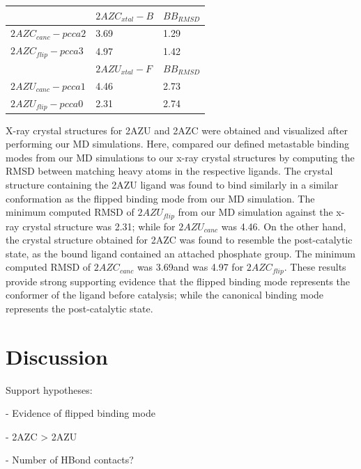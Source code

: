 \documentclass[fleqn,10pt]{wlscirep}
\newcommand{\angstrom}{\text{\normalfont\AA}}
\begin{document}
\begin{table}[!ht]
\begin{tabular}{|l|l|l|}
\hline
                          & \textbf{$2AZC_{xtal}-B$} & \textbf{$BB_{RMSD}$} \\ \hline
\textbf{$2AZC_{canc}-pcca2$} & 3.69                  & 1.29             \\ \hline
\textbf{$2AZC_{flip}-pcca3$} & 4.97                  & 1.42              \\ \hline
\textbf{}                 & \textbf{$2AZU_{xtal}-F$} & \textbf{$BB_{RMSD}$} \\ \hline
\textbf{$2AZU_{canc}-pcca1$} & 4.46                  & 2.73             \\ \hline
\textbf{$2AZU_{flip}-pcca0$} & 2.31                  & 2.74              \\ \hline
\end{tabular}
\end{table}

X-ray crystal structures for 2AZU and 2AZC were obtained and visualized after performing our MD simulations.
Here, compared our defined metastable binding modes from our MD simulations to our x-ray crystal structures by computing the RMSD between matching heavy atoms in the respective ligands.
The crystal structure containing the 2AZU ligand was found to bind similarly in a similar conformation as the flipped binding mode from our MD simulation.
The minimum computed RMSD of $2AZU_{flip}$ from our MD simulation against the x-ray crystal structure was 2.31\angstrom; while for $2AZU_{canc}$ was 4.46\angstrom.
On the other hand, the crystal structure obtained for 2AZC was found to resemble the post-catalytic state, as the bound ligand contained an attached phosphate group.
The minimum computed RMSD of $2AZC_{canc}$ was 3.69\angstrom and was 4.97 for $2AZC_{flip}$.
These results provide strong supporting evidence that the flipped binding mode represents the conformer of the ligand before catalysis; while the canonical binding mode represents the post-catalytic state.

\section{Discussion}
Support hypotheses:

  - Evidence of flipped binding mode
  
  - 2AZC > 2AZU
  
     - Number of HBond contacts?
     
\end{document}
